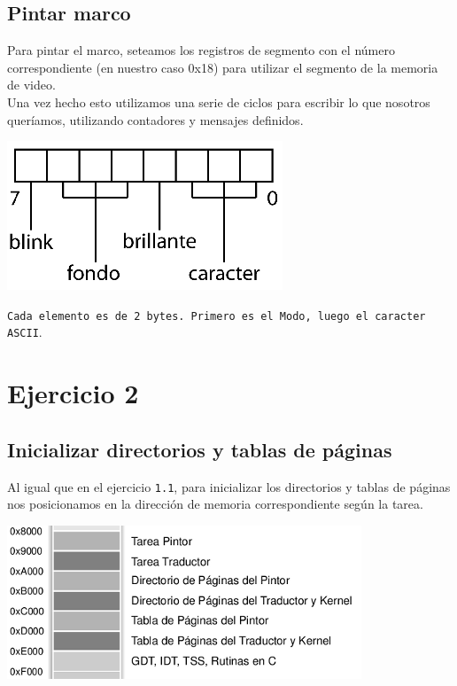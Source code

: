 \documentclass[a4paper, 10pt]{article}
\begin{document}
\subsection{Pintar marco}
Para pintar el marco, seteamos los registros de segmento con el n\'umero correspondiente (en nuestro caso 0x18) para utilizar el segmento de la memoria de video. \\
Una vez hecho esto utilizamos una serie de ciclos para escribir lo que nosotros quer\'iamos, utilizando contadores y mensajes definidos.

\begin{center}
	\includegraphics[scale=0.60]{Graficos/word_video.png}
\end{center}
\texttt{Cada elemento es de 2 bytes. Primero es el Modo, luego el caracter ASCII}. 
 
\newpage
  
\section{Ejercicio 2}
\subsection{ Inicializar directorios y tablas de p\'aginas }

Al igual que en el ejercicio \texttt{1.1}, para inicializar los directorios y tablas de p\'aginas nos posicionamos en la direcci\'on de memoria correspondiente seg\'un la tarea.

\vspace*{2em}

\begin{center}
	\includegraphics[scale=0.65]{Graficos/directorios_y_tablas_de_paginas.png}
\end{center}
\end{document}

